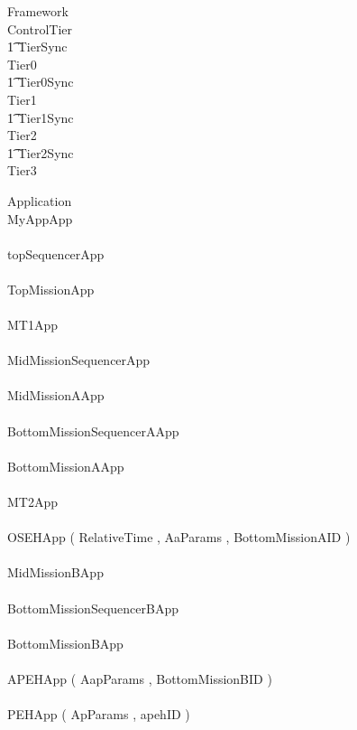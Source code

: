 %
%
%
\begin{circus}
\circprocess Framework \circdef \\
\circblockopen
ControlTier \\
\t1 \lpar TierSync \rpar \\
 \circblockopen
Tier0
\\ \t1 \lpar Tier0Sync \rpar \\
Tier1
\\ \t1 \lpar Tier1Sync \rpar \\
Tier2
\\ \t1 \lpar Tier2Sync \rpar \\
Tier3
\circblockclose
\circblockclose
\end{circus}
%
%
\begin{circus}
\circprocess  Application \circdef \\
\circblockopen
MyAppApp\\
\interleave\\
topSequencerApp\\
\interleave \\
		TopMissionApp\\
		\interleave \\
			MT1App\\
			\interleave \\
			MidMissionSequencerApp\\
			
		
		\interleave \\
		MidMissionAApp\\
		\interleave \\
			BottomMissionSequencerAApp\\
			
		
		\interleave \\
		BottomMissionAApp\\
		\interleave \\
			MT2App\\
			\interleave \\
			OSEHApp ( RelativeTime ,  AaParams ,  BottomMissionAID  ) \\
			
		\interleave \\
		MidMissionBApp\\
		\interleave \\
			BottomMissionSequencerBApp\\
			
		
		\interleave \\
		BottomMissionBApp\\
		\interleave \\
			APEHApp ( AapParams ,  BottomMissionBID  ) \\
			\interleave \\
			PEHApp ( ApParams ,  apehID  ) \\
			
		
\circblockclose
\end{circus}

